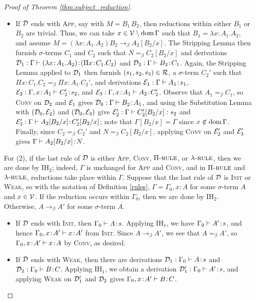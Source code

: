 \documentclass[reqno, twoside]{article}
\begin{document}
\begin{proof}[Proof of Theorem \ref{thm:subject_reduction}]
\begin{itemize}
            \item If $\mathcal{D}$ ends with \textsc{App}, say with $M=B_1\,B_2$, then reductions within either $B_1$ or $B_2$ are trivial. Thus, we can take $x\in\mathcal{V}\setminus\operatorname{dom}\Gamma$ such that $B_1=\lambda x\!:\!A_1.A_2$, and assume $M=(\lambda x\!:\!A_1.A_2)B_2\rightarrow_\beta A_2[B_2/x]$. The Stripping Lemma then furnish $\sigma$-terms $C_1$ and $C_2$ such that $N=_\beta C_2[B_2/x]$ and derivations $\mathcal{D}_1:\Gamma\vdash(\lambda x\!:\!A_1.A_2)\!:\!(\Pi x\!:\!C_1.C_2)$ and $\mathcal{D}_2:\Gamma\vdash B_2\!:\!C_1$. Again, the Stripping Lemma applied to $\mathcal{D}_1$ then furnish $(s_1,s_2,s_3)\in\mathcal{R}$, a $\sigma$-term $C_2'$ such that $\Pi x\!:\!C_1.C_2=_\beta\Pi x\!:\!A_1.C_2'$, and derivations $\mathcal{E}_1:\Gamma\vdash A_1\!:\!s_1$, $\mathcal{E}_2:\Gamma,x\!:\!A_1\vdash C'_2\!:\!s_2$, and $\mathcal{E}_3:\Gamma,x\!:\!A_1\vdash A_2\!:\!C_2'$. Observe that $A_1=_\beta C_1$, so \textsc{Conv} on $\mathcal{D}_2$ and $\mathcal{E}_1$ gives $\mathcal{D}_0:\Gamma\vdash B_2\!:\!A_1$, and using the Substitution Lemma with $(\mathcal{D}_0,\mathcal{E}_2)$ and $(\mathcal{D}_0,\mathcal{E}_3)$ give $\mathcal{E}_2':\Gamma\vdash C_2'[B_2/x]:s_2$ and $\mathcal{E}_3':\Gamma\vdash A_2[B_2/x]\!:\!C_2'[B_2/x]$; note that $\Gamma[B_2/x]=\Gamma$ since $x\not\in\operatorname{dom}\Gamma$. Finally, since $C_2=_\beta C_2'$ and $N=_\beta C_2[B_2/x]$, applying \textsc{Conv} on $\mathcal{E}_2'$ and $\mathcal{E}_3'$ gives $\Gamma\vdash A_2[B_2/x]\!:\!N$.
        \end{itemize}
        For (2), if the last rule of $\mathcal{D}$ is either \textsc{App}, \textsc{Conv}, $\Pi{\normalfont\textsc{-rule}}$, or $\lambda{\normalfont\textsc{-rule}}$, then we are done by $\mathrm{IH}_2$; indeed, $\Gamma$ is unchanged for \textsc{App} and \textsc{Conv}, and in $\Pi{\normalfont\textsc{-rule}}$ and $\lambda{\normalfont\textsc{-rule}}$, reductions take place within $\Gamma$. Suppose that the last rule of $\mathcal{D}$ is \textsc{Init} or \textsc{Weak}, so with the notation of Definition \ref{rules}, $\Gamma=\Gamma_0,x\!:\!A$ for some $\sigma$-term $A$ and $x\in\mathcal{V}$. If the reduction occurs within $\Gamma_0$, then we are done by $\mathrm{IH}_2$. Otherwise, $A\rightarrow_\beta A'$ for some $\sigma$-term $A$.
        \begin{itemize}\small\vspace{-0.05in}
            \item If $\mathcal{D}$ ends with \textsc{Init}, then $\Gamma_0\vdash A\!:\!s$. Applying $\mathrm{IH}_1$, we have $\Gamma_0\vdash A'\!:\!s$, and hence $\Gamma_0,x\!:\!A'\vdash x\!:\!A'$ from \textsc{Init}. Since $A\rightarrow_\beta A'$, we see that $A=_\beta A'$, so $\Gamma_0,x\!:\!A'\vdash x\!:\!A$ by \textsc{Conv}, as desired.
                \vspace{-0.05in}
            \item If $\mathcal{D}$ ends with \textsc{Weak}, then there are derivations $\mathcal{D}_1:\Gamma_0\vdash A\!:\!s$ and $\mathcal{D}_2:\Gamma_0\vdash B\!:\!C$. Applying $\mathrm{IH}_1$, we obtain a derivation $\mathcal{D}_1':\Gamma_0\vdash A'\!:\!s$, and applying \textsc{Weak} on $\mathcal{D}_1'$ and $\mathcal{D}_2$ gives $\Gamma_0,x\!:\!A'\vdash B\!:\!C$.
        \end{itemize}\vspace{-0.25in}
    \end{proof}
\end{document}
